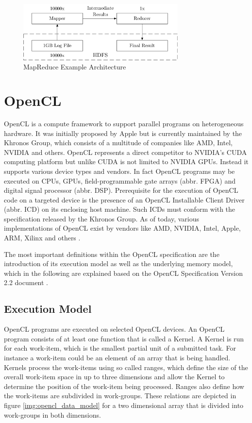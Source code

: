 \begin{figure}[!htb]	
	\includegraphics[width=0.75\textwidth]{drawings/mapreduce_arch.pdf}
	\centering
	\caption{MapReduce Example Architecture}
	\label{img:mapreduce_arch}
\end{figure}

\section{OpenCL}
\label{opencl}
OpenCL is a compute framework to support parallel programs on heterogeneous hardware. It was initially proposed by Apple but is currently maintained by the Khronos Group, which consists of a multitude of companies like AMD, Intel, NVIDIA and others\cite{opencl_directors}. OpenCL represents a direct competitor to NVIDIA's CUDA computing platform but unlike CUDA is not limited to NVIDIA GPUs. Instead it supports various device types and vendors. In fact OpenCL programs may be executed on CPUs, GPUs, field-programmable gate arrays (abbr. FPGA) and digital signal processor (abbr. DSP). Prerequisite for the execution of OpenCL code on a targeted device is the presence of an OpenCL Installable Client Driver (abbr. ICD) on its enclosing host machine. Such ICDs must conform with the specification released by the Khronos Group. As of today, various implementations of OpenCL exist by vendors like AMD, NVIDIA, Intel, Apple, ARM, Xilinx and others \cite{opencl_conform}.

The most important definitions within the OpenCL specification are the introduction of its execution model as well as the underlying memory model, which in the following are explained based on the OpenCL Specification Version 2.2 document \cite{opencl_spec}.

\subsection*{Execution Model}
OpenCL programs are executed on selected OpenCL devices. An OpenCL program consists of at least one function that is called a Kernel. A Kernel is run for each work-item, which is the smallest partial unit of a submitted task. For instance a work-item could be an element of an array that is being handled. Kernels process the work-items using so called ranges, which define the size of the overall work-item space in up to three dimensions and allow the Kernel to determine the position of the work-item being processed. Ranges also define how the work-items are subdivided in work-groups. These relations are depicted in figure \ref{img:opencl_data_model} for a two dimensional array that is divided into work-groups in both dimensions.

